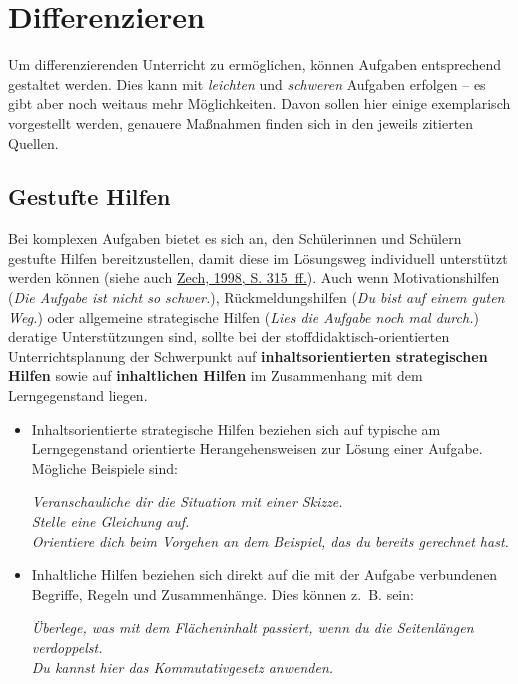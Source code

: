 \documentclass[
  ngerman,
]{scrbook}
\theoremstyle{definition}
\theoremstyle{definition}
\theoremstyle{definition}
\theoremstyle{definition}
\theoremstyle{remark}
\begin{document}
\hypertarget{differenzieren}{%
\section{Differenzieren}\label{differenzieren}}

Um differenzierenden Unterricht zu ermöglichen, können Aufgaben entsprechend gestaltet werden. Dies kann mit \emph{leichten} und \emph{schweren} Aufgaben erfolgen -- es gibt aber noch weitaus mehr Möglichkeiten. Davon sollen hier einige exemplarisch vorgestellt werden, genauere Maßnahmen finden sich in den jeweils zitierten Quellen.

\hypertarget{gestufte-hilfen}{%
\subsection{Gestufte Hilfen}\label{gestufte-hilfen}}

Bei komplexen Aufgaben bietet es sich an, den Schülerinnen und Schülern gestufte Hilfen bereitzustellen, damit diese im Lösungsweg individuell unterstützt werden können (siehe auch \protect\hyperlink{ref-Zech1998}{Zech, 1998, S. 315~ff.}). Auch wenn Motivationshilfen (\emph{Die Aufgabe ist nicht so schwer.}), Rückmeldungshilfen (\emph{Du bist auf einem guten Weg.}) oder allgemeine strategische Hilfen (\emph{Lies die Aufgabe noch mal durch.}) deratige Unterstützungen sind, sollte bei der stoffdidaktisch-orientierten Unterrichtsplanung der Schwerpunkt auf \textbf{inhaltsorientierten strategischen Hilfen} sowie auf \textbf{inhaltlichen Hilfen} im Zusammenhang mit dem Lerngegenstand liegen.

\begin{itemize}
\item
  Inhaltsorientierte strategische Hilfen beziehen sich auf typische am Lerngegenstand orientierte Herangehensweisen zur Lösung einer Aufgabe. Mögliche Beispiele sind:

  \emph{Veranschauliche dir die Situation mit einer Skizze.}\\
  \emph{Stelle eine Gleichung auf.}\\
  \emph{Orientiere dich beim Vorgehen an dem Beispiel, das du bereits gerechnet hast.}
\item
  Inhaltliche Hilfen beziehen sich direkt auf die mit der Aufgabe verbundenen Begriffe, Regeln und Zusammenhänge. Dies können z.~B. sein:

  \emph{Überlege, was mit dem Flächeninhalt passiert, wenn du die Seitenlängen verdoppelst.}\\
  \emph{Du kannst hier das Kommutativgesetz anwenden.}
\end{itemize}
\end{document}
